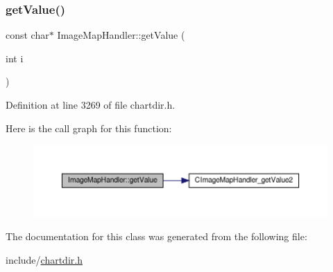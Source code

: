 \subsubsection{\texorpdfstring{get\+Value()}{getValue()}\hspace{0.1cm}{\footnotesize\ttfamily [2/2]}}
{\footnotesize\ttfamily const char$\ast$ Image\+Map\+Handler\+::get\+Value (\begin{DoxyParamCaption}\item[{int}]{i }\end{DoxyParamCaption})\hspace{0.3cm}{\ttfamily [inline]}}



Definition at line 3269 of file chartdir.\+h.

Here is the call graph for this function\+:
\nopagebreak
\begin{figure}[H]
\begin{center}
\leavevmode
\includegraphics[width=350pt]{class_image_map_handler_aea6dfdd08bc4e2fa35bda829e3984389_cgraph}
\end{center}
\end{figure}


The documentation for this class was generated from the following file\+:\begin{DoxyCompactItemize}
\item 
include/\hyperlink{chartdir_8h}{chartdir.\+h}\end{DoxyCompactItemize}
